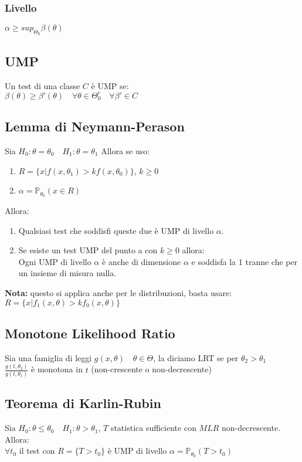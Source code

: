 \documentclass[a4paper,notitlepage]{report}%
\newcommand{\p}{\mathbb{P}} %
\begin{document}
\begin{multicols*}{2}
        \subsubsection*{Livello}
        $\alpha \geq sup_{\Theta_0} \beta(\theta)$


    \subsection*{UMP}
    Un test di una classe $C$ è UMP se:\\
    $\beta(\theta)\geq\beta'(\theta) \quad \forall\theta\in\Theta_0^c\quad \forall \beta'\in C$


    \subsection*{Lemma di Neymann-Perason}
    Sia $H_0: \theta = \theta_0 \quad H_1: \theta = \theta_1$
    Allora se uso:
    \begin{enumerate}
        \item $R=\{x| f(x,\theta_1)>kf(x,\theta_0) \}$, $k\geq0$
        \item $\alpha = \p_{\theta_0}(x\in R)$
    \end{enumerate}
    Allora:
    \begin{enumerate}[label=\alph*]
        \item Qualsiasi test che soddisfi queste due è UMP
            di livello $\alpha$.
        \item Se esiste un test UMP del punto a con $k\geq0$ allora:\\
            Ogni UMP di livello $\alpha$ è anche di dimensione $\alpha$
            e soddisfa la 1 tranne che per un insieme di misura nulla.
    \end{enumerate}
    \textbf{Nota:} questo si applica anche per le distribuzioni, 
    basta usare: \\
    $R=\{x| f_1(x,\theta)>kf_0(x,\theta) \}$
    

    \subsection*{Monotone Likelihood Ratio}
    Sia una famiglia di leggi $g(x,\theta) \quad\theta\in\Theta$,
    la diciamo LRT se per $\theta_2 > \theta_1$ \\
    $\frac{ g(t,\theta_2 )}{g(t,\theta_1 )}$ è monotona in $t$ (non-crescente o non-decrescente)


    \subsection*{Teorema di Karlin-Rubin}
    Sia $H_0: \theta \leq \theta_0 \quad H_1: \theta > \theta_1$,
    $T$ statistica sufficiente con $MLR$ non-decrescente. Allora: \\
    $\forall t_0$ il test con $R=\{ T > t_0 \}$ è UMP di livello
    $\alpha= \p_{\theta_0}(T>t_0)$


\end{multicols*}
\end{document}
